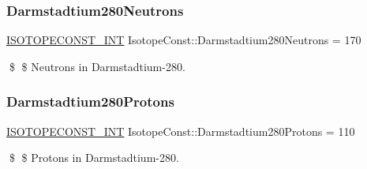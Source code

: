 \subsubsection{\texorpdfstring{Darmstadtium280\+Neutrons}{Darmstadtium280Neutrons}}
{\footnotesize\ttfamily \mbox{\hyperlink{group___isotope_const-_macros_ga5f18360b3e99483a35c32d789e62621c}{I\+S\+O\+T\+O\+P\+E\+C\+O\+N\+S\+T\+\_\+\+I\+NT}} Isotope\+Const\+::\+Darmstadtium280\+Neutrons = 170}

\$ \$ Neutrons in Darmstadtium-\/280. \mbox{\label{group___isotope_const-_darmstadtium-_ds280_gaa4b38753e3c4fd161e6998ae9c9607a4}} 
\subsubsection{\texorpdfstring{Darmstadtium280\+Protons}{Darmstadtium280Protons}}
{\footnotesize\ttfamily \mbox{\hyperlink{group___isotope_const-_macros_ga5f18360b3e99483a35c32d789e62621c}{I\+S\+O\+T\+O\+P\+E\+C\+O\+N\+S\+T\+\_\+\+I\+NT}} Isotope\+Const\+::\+Darmstadtium280\+Protons = 110}

\$ \$ Protons in Darmstadtium-\/280. 